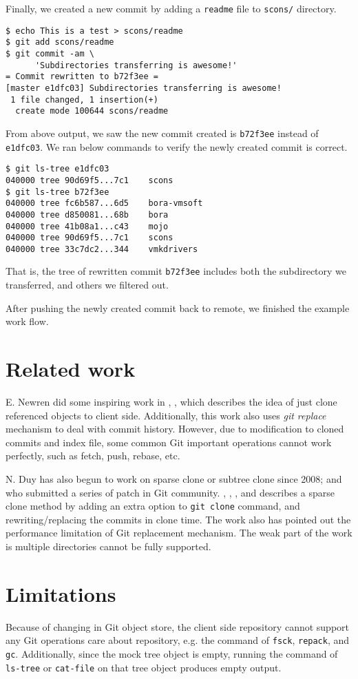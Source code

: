 \documentclass[preprint]{sigplanconf}
\begin{document}
Finally, we created a new commit by adding a \verb|readme| file to \verb|scons/|
directory.
\begin{verbatim}
$ echo This is a test > scons/readme
$ git add scons/readme
$ git commit -am \
      'Subdirectories transferring is awesome!'
= Commit rewritten to b72f3ee =
[master e1dfc03] Subdirectories transferring is awesome!
 1 file changed, 1 insertion(+)
  create mode 100644 scons/readme
\end{verbatim}
From above output, we saw the new commit created is \verb|b72f3ee| instead of
\verb|e1dfc03|.
We ran below commands to verify the newly created commit is correct.
\begin{verbatim}
$ git ls-tree e1dfc03
040000 tree 90d69f5...7c1    scons
$ git ls-tree b72f3ee
040000 tree fc6b587...6d5    bora-vmsoft
040000 tree d850081...68b    bora
040000 tree 41b08a1...c43    mojo
040000 tree 90d69f5...7c1    scons
040000 tree 33c7dc2...344    vmkdrivers
\end{verbatim}
That is, the tree of rewritten commit \verb|b72f3ee| includes both
the subdirectory we transferred, and others we filtered out.

After pushing the newly created commit back to remote, we finished the
example work flow.

\section{Related work}
E. Newren did some inspiring work in \cite{newren10-0}, \cite{newren10-1},
which describes the idea of just clone referenced objects to client side.
Additionally, this work also uses \emph{git replace} mechanism to deal with
commit history\cite{git-replace}.
However, due to modification to cloned commits and index file, some common Git
important operations cannot work perfectly, such as fetch, push, rebase, etc.

N. Duy has also begun to work on sparse clone or subtree clone since 2008; and
who submitted a series of patch in Git community.
\cite{duy08}, \cite{duy10-1}, \cite{duy10-2}, and \cite{duy10-3} describes a
sparse clone method by adding an extra option to \verb|git clone| command, and
rewriting/replacing the commits in clone time.
The work also has pointed out the performance limitation of Git replacement
mechanism.
The weak part of the work is multiple directories cannot be fully supported.

\section{Limitations}
Because of changing in Git object store, the client side repository cannot
support any Git operations care about repository, e.g. the command of
\verb|fsck|, \verb|repack|, and \verb|gc|.
Additionally, since the mock tree object is empty, running the command of
\verb|ls-tree| or \verb|cat-file| on that tree object produces empty output.
\end{document}

